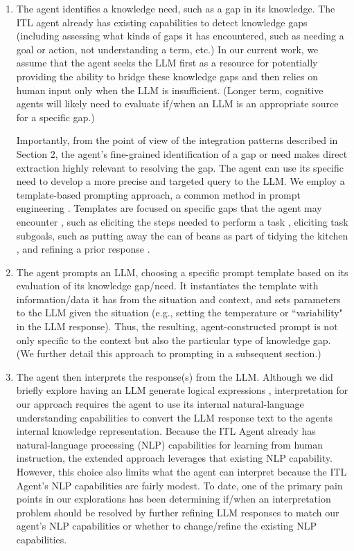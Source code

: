 \documentclass[letterpaper]{article} %
\begin{document}
\begin{enumerate}
    \item The agent identifies a knowledge need, such as a gap in its knowledge. The ITL agent already has existing capabilities to detect knowledge gaps (including assessing what kinds of gaps it has encountered, such as needing a goal or action, not understanding a term, etc.) In our current work, we assume that the agent seeks the LLM first as a resource for potentially providing the ability to bridge these knowledge gaps and then relies on human input only when the LLM is insufficient. (Longer term, cognitive agents will likely need to evaluate if/when an LLM is an appropriate source for a specific gap.)

    Importantly, from the point of view of the integration patterns described in Section 2, the agent's fine-grained identification of a gap or need makes direct extraction highly relevant to resolving the gap.  The agent can use its specific need to develop a more precise and targeted query to the LLM. We employ a template-based prompting approach, a common method in prompt engineering \cite{reynolds_prompt_2021}. Templates are focused on specific gaps that the agent may encounter \cite{wray_language_2021}, such as eliciting the steps needed to perform a task \cite{kirk_improving_2022}, eliciting task subgoals, such as putting away the can of beans as part of tidying the kitchen \cite{kirk_integrating_2023}, and refining a prior response \cite{kirk_improving_2023}.



\item The agent prompts an LLM, choosing a specific prompt template based on its evaluation of its knowledge gap/need. It instantiates the template with information/data it has from the situation and context, and sets parameters to the LLM given the situation (e.g., setting the temperature or ``variability" in the LLM response). Thus, the resulting, agent-constructed prompt is not only specific to the context but also the particular type of knowledge gap. (We further detail this approach to prompting in a subsequent section.)

\item The agent then interprets the response(s) from the LLM. Although we did briefly explore having an LLM generate logical expressions \cite{kirk_improving_2022}, interpretation for our approach requires the agent to use its internal natural-language understanding capabilities to convert the LLM response text to the agents internal knowledge representation. Because the ITL Agent already has natural-language processing (NLP) capabilities for learning from human instruction, the extended approach leverages that existing NLP capability. However, this choice also limits what the agent can interpret because the ITL Agent's NLP capabilities are fairly modest. To date, one of the primary pain points in our explorations has been determining if/when an interpretation problem should be resolved by further refining LLM responses to match our agent's NLP capabilities or whether to change/refine the existing NLP capabilities.


\end{enumerate}
\end{document}
